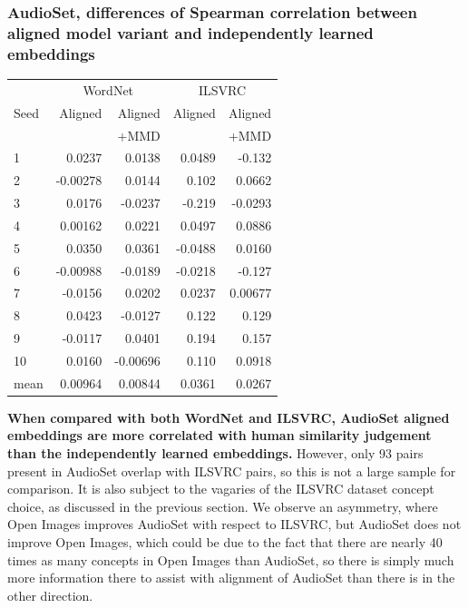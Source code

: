 \subsubsection{AudioSet, differences of Spearman correlation between aligned model variant and independently learned embeddings}


\begin{table}[H]
\centering
\begin{tabular}{lrrrr}
\toprule
\multicolumn{1}{r}{} & \multicolumn{2}{c}{WordNet} & \multicolumn{2}{c}{ILSVRC} \\
\cmidrule(lr){2-3} \cmidrule(lr){4-5}
{Seed} &      Aligned &  Aligned  &  Aligned &  Aligned   \\
{}     &               & +MMD     &          &   +MMD     \\
\midrule
1    &    0.0237 &     0.0138  &   0.0489 &    -0.132    \\
2    &   -0.00278 &     0.0144 &   0.102  &     0.0662   \\
3    &    0.0176 &    -0.0237  &  -0.219  &    -0.0293   \\
4    &    0.00162 &     0.0221 &   0.0497 &     0.0886   \\
5    &    0.0350 &     0.0361  &  -0.0488 &     0.0160   \\
6    &   -0.00988 &    -0.0189 &  -0.0218 &    -0.127    \\
7    &   -0.0156 &     0.0202  &   0.0237 &     0.00677  \\
8    &    0.0423 &    -0.0127  &   0.122  &     0.129    \\
9    &   -0.0117 &     0.0401  &   0.194  &     0.157    \\
10   &    0.0160 &    -0.00696 &   0.110  &     0.0918   \\
\midrule                                                                    
mean &    0.00964 &     0.00844 &   0.0361 &     0.0267  \\
\bottomrule
\end{tabular}
\end{table}

\textbf{When compared with both WordNet and ILSVRC, AudioSet aligned embeddings are more correlated with human similarity judgement than the independently learned embeddings.}  However, only 93 pairs present in AudioSet overlap with ILSVRC pairs, so this is not a large sample for comparison. It is also subject to the vagaries of the ILSVRC dataset concept choice, as discussed in the previous section. We observe an asymmetry, where Open Images improves AudioSet with respect to ILSVRC, but AudioSet does not improve Open Images, which could be due to the fact that there are nearly 40 times as many concepts in Open Images than AudioSet, so there is simply much more information there to assist with alignment of AudioSet than there is in the other direction. 


